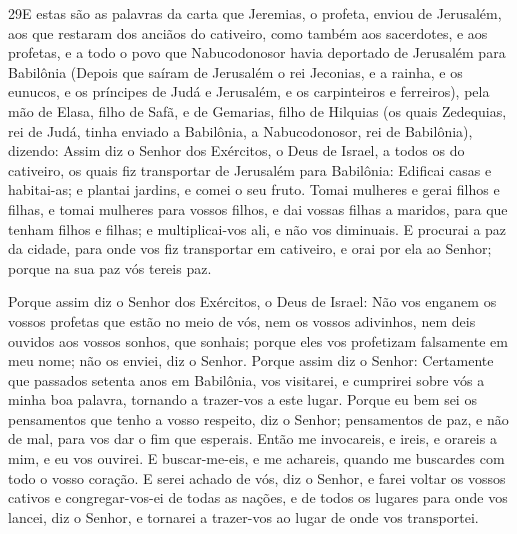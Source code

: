 \medskip

\lettrine{29} E estas são as palavras da carta que Jeremias, o
profeta, enviou de Jerusalém, aos que restaram dos anciãos do
cativeiro, como também aos sacerdotes, e aos profetas, e a todo o
povo que Nabucodonosor havia deportado de Jerusalém para Babilônia
 (Depois que saíram de Jerusalém o rei Jeconias, e a rainha, e os
eunucos, e os príncipes de Judá e Jerusalém, e os carpinteiros e
ferreiros), pela mão de Elasa, filho de Safã, e de Gemarias,
filho de Hilquias (os quais Zedequias, rei de Judá, tinha enviado a
Babilônia, a Nabucodonosor, rei de Babilônia), dizendo: Assim
diz o Senhor dos Exércitos, o Deus de Israel, a todos os do
cativeiro, os quais fiz transportar de Jerusalém para Babilônia:
Edificai casas e habitai-as; e plantai jardins, e comei o seu
fruto. Tomai mulheres e gerai filhos e filhas, e tomai mulheres
para vossos filhos, e dai vossas filhas a maridos, para que tenham
filhos e filhas; e multiplicai-vos ali, e não vos diminuais. E
procurai a paz da cidade, para onde vos fiz transportar em
cativeiro, e orai por ela ao Senhor; porque na sua paz vós tereis
paz.

Porque assim diz o Senhor dos Exércitos, o Deus de Israel: Não vos
enganem os vossos profetas que estão no meio de vós, nem os vossos
adivinhos, nem deis ouvidos aos vossos sonhos, que sonhais;
porque eles vos profetizam falsamente em meu nome; não os
enviei, diz o Senhor. Porque assim diz o Senhor: Certamente
que passados setenta anos em Babilônia, vos visitarei, e cumprirei
sobre vós a minha boa palavra, tornando a trazer-vos a este lugar.
Porque eu bem sei os pensamentos que tenho a vosso respeito,
diz o Senhor; pensamentos de paz, e não de mal, para vos dar o fim
que esperais. Então me invocareis, e ireis, e orareis a mim,
e eu vos ouvirei. E buscar-me-eis, e me achareis, quando me
buscardes com todo o vosso coração. E serei achado de vós,
diz o Senhor, e farei voltar os vossos cativos e congregar-vos-ei de
todas as nações, e de todos os lugares para onde vos lancei, diz o
Senhor, e tornarei a trazer-vos ao lugar de onde vos transportei.

